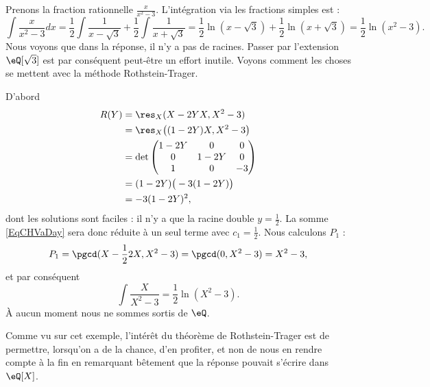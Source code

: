 \begin{example}
	Prenons la fraction rationnelle \( \frac{ x }{ x^2-3 }\). L'intégration via les fractions simples est :
	\begin{equation}
		\int\frac{ x }{ x^2-3 }dx=\frac{ 1 }{2}\int\frac{ 1 }{ x-\sqrt{3} }+\frac{ 1 }{2}\int\frac{1}{ x+\sqrt{3} }=\frac{ 1 }{2}\ln(x-\sqrt{3})+\frac{ 1 }{2}\ln(x+\sqrt{3})=\frac{ 1 }{2}\ln(x^2-3).
	\end{equation}
	Nous voyons que dans la réponse, il n'y a pas de racines. Passer par l'extension \( \eQ[\sqrt{3}]\) est par conséquent peut-être un effort inutile. Voyons comment les choses se mettent avec la méthode Rothstein-Trager.

	D'abord
	\begin{subequations}
		\begin{align}
			R(Y) & =\res_X(X-2YX,X^2-3)             \\
			     & =\res_X\big( (1-2Y)X,X^2-3 \big) \\
			     & =\det\begin{pmatrix}
				            1-2Y & 0    & 0  \\
				            0    & 1-2Y & 0  \\
				            1    & 0    & -3
			            \end{pmatrix}            \\
			     & =(1-2Y)\big( -3(1-2Y) \big)      \\
			     & =-3(1-2Y)^2,
		\end{align}
	\end{subequations}
	dont les solutions sont faciles : il n'y a que la racine double \( y=\frac{ 1 }{2}\). La somme \eqref{EqCHVaDay} sera donc réduite à un seul terme avec \( c_1=\frac{ 1 }{2}\). Nous calculons \( P_1\) :
	\begin{equation}
		P_1=\pgcd(X-\frac{ 1 }{2}2X,X^2-3)=\pgcd(0,X^2-3)=X^2-3,
	\end{equation}
	et par conséquent
	\begin{equation}
		\int\frac{ X }{ X^2-3 }=\frac{ 1 }{2}\ln(X^2-3).
	\end{equation}
	À aucun moment nous ne sommes sortis de \( \eQ\).
\end{example}

Comme vu sur cet exemple, l'intérêt du théorème de Rothstein-Trager est de permettre, lorsqu'on a de la chance, d'en profiter, et non de nous en rendre compte à la fin en remarquant bêtement que la réponse pouvait s'écrire dans \( \eQ[X]\).

